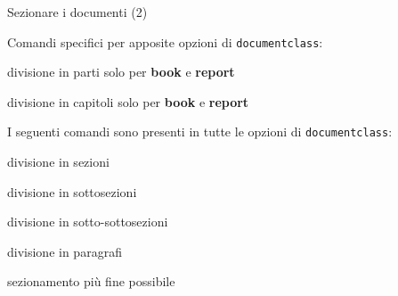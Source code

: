 \begin{frame}{Sezionare i documenti (2)}


Comandi specifici per apposite opzioni di \texttt{documentclass}:

\begin{description}[labelwidth=20pt]
	\item [\texttt{part}] divisione in parti solo per \textbf{book} e
	\textbf{report}
	\item [\texttt{chapter}] divisione in capitoli solo per \textbf{book} e 
	\textbf{report}
\end{description}

I seguenti comandi sono presenti in tutte le opzioni di \texttt{documentclass}:

\begin{description}[labelwidth=20pt]
	\item [\texttt{section}] divisione in sezioni
	\item [\texttt{subsection}] divisione in sottosezioni
	\item [\texttt{subsubsection}] divisione in sotto-sottosezioni
	\item [\texttt{paragraph}] divisione in paragrafi
	\item [\texttt{subparagraph}] sezionamento più fine possibile
\end{description}

\end{frame}